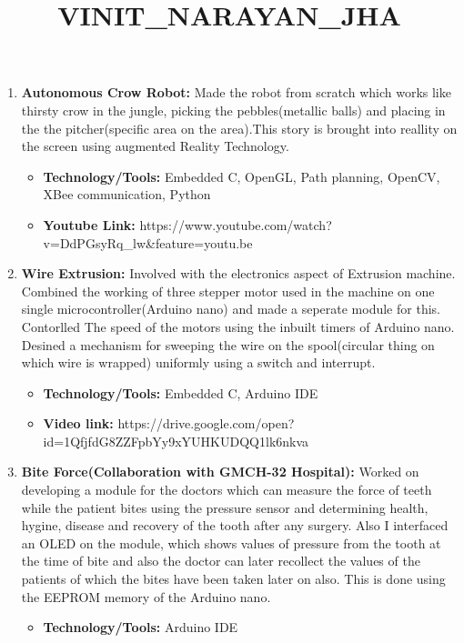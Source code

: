 \documentclass[letterpaper,11pt]{article}
\title{VINIT_NARAYAN_JHA}
\newlength{\outerbordwidth}
\newcommand{\resheading}[1]{\vspace{8pt}
  \parbox{\textwidth}{\setlength{\FrameSep}{\outerbordwidth}
    \begin{shaded}
\setlength{\fboxsep}{0pt}\framebox[\textwidth][l]{\setlength{\fboxsep}{4pt}\fcolorbox{shadecolorB}{shadecolorB}{\textbf{\sffamily{\mbox{~}\makebox[6.762in][l]{\large #1} \vphantom{p\^{E}}}}}}
    \end{shaded}
  }\vspace{-5pt}
}
\begin{document}
\resheading{Projects}
 \begin{enumerate}

\item \textbf {Autonomous Crow Robot:}
Made the robot from scratch which works like thirsty crow in the jungle, picking the pebbles(metallic balls) and placing in the the pitcher(specific area on the area).This story is brought into reallity on the screen using augmented Reality Technology. 
\begin{itemize}
\item \textbf{Technology/Tools:} Embedded C, OpenGL, Path planning, OpenCV, XBee communication, Python 
\end{itemize}
\begin{itemize}
\item \textbf{Youtube Link:} https://www.youtube.com/watch?v=DdPGsyRq_lw&feature=youtu.be
\end{itemize}

\item \textbf {Wire Extrusion:}
Involved with the electronics aspect of Extrusion machine. Combined the working of three stepper motor used in the machine on one single microcontroller(Arduino nano) and made a seperate module for this. Contorlled The speed of the motors using the inbuilt timers of Arduino nano. Desined a mechanism for sweeping the wire on the spool(circular thing on which wire is wrapped) uniformly using a switch and interrupt. 

\begin{itemize}
\item \textbf{Technology/Tools:} Embedded C, Arduino IDE
\end{itemize}
\begin{itemize}
\item \textbf{Video link:} https://drive.google.com/open?id=1QfjfdG8ZZFpbYy9xYUHKUDQQ1lk6nkva
\end{itemize}

 
  \item \textbf{Bite Force(Collaboration with GMCH-32 Hospital):} 
Worked on developing a module for the doctors which can measure the force of teeth while the patient bites using the pressure sensor and determining  health, hygine, disease and recovery of the tooth after any surgery. Also I interfaced an OLED on the module, which shows values of pressure from the tooth at the time of bite and also the doctor can later recollect the values of the patients of which the bites have been taken later on also. This is done using the EEPROM memory of the Arduino nano.
\begin{itemize}
\item \textbf{Technology/Tools:} Arduino IDE
\end{itemize}


\end{enumerate}
\end{document}
